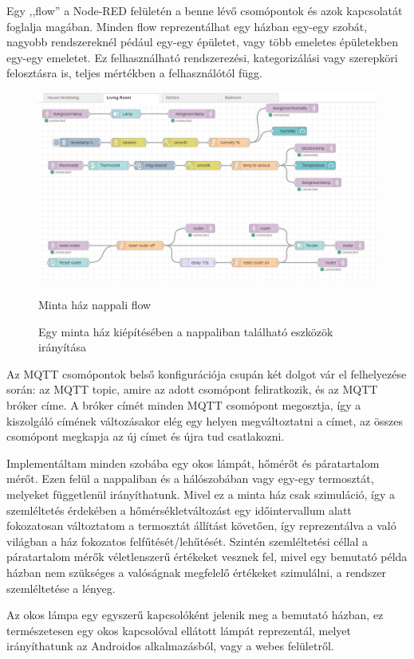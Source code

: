 \documentclass[
]{thesis-ekf}
\theoremstyle{definition}
\theoremstyle{remark}
\begin{document}
Egy ,,flow'' a Node-RED felületén a benne lévő csomópontok és azok kapcsolatát foglalja magában. 
Minden flow reprezentálhat egy házban egy-egy szobát, nagyobb rendszereknél pédául egy-egy épületet, vagy több emeletes épületekben egy-egy emeletet.
Ez felhasználható rendszerezési, kategorizálási vagy szerepköri felosztásra is, teljes mértékben a felhasználótól függ.

\begin{figure}[h]
	\includegraphics[width=1\textwidth]{images/flow.png}
	\caption{Minta ház nappali flow}
	\caption{Egy minta ház kiépítésében a nappaliban található eszközök irányítása}
\end{figure}

Az MQTT csomópontok belső konfigurációja csupán két dolgot vár el felhelyezése során: az MQTT topic, amire az adott csomópont feliratkozik, és az MQTT bróker címe. A bróker címét minden MQTT csomópont megosztja, így a kiszolgáló címének változásakor
elég egy helyen megváltoztatni a címet, az összes csomópont megkapja az új címet és újra tud csatlakozni.

Implementáltam minden szobába egy okos lámpát, hőmérőt és páratartalom mérőt. Ezen felül a nappaliban és a hálószobában vagy egy-egy termosztát, melyeket függetlenül irányíthatunk. Mivel ez a minta ház csak szimuláció, így a szemléltetés érdekében
a hőmérsékletváltozást egy időintervallum alatt fokozatosan változtatom a termosztát állítást követően, így reprezentálva a való világban a ház fokozatos felfűtését/lehűtését. Szintén szemléltetési céllal a páratartalom mérők
véletlenszerű értékeket vesznek fel, mivel egy bemutató példa házban nem szükséges a valóságnak megfelelő értékeket szimulálni, a rendszer szemléltetése a lényeg.

Az okos lámpa egy egyszerű kapcsolóként jelenik meg a bemutató házban, ez természetesen egy okos kapcsolóval ellátott lámpát reprezentál, melyet irányíthatunk az Androidos alkalmazásból, vagy a webes felületről.
\end{document}
